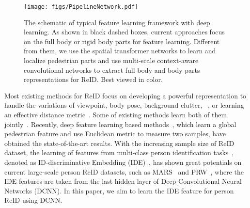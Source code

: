 \documentclass[10pt,twocolumn,letterpaper]{article}
\begin{document}
\begin{figure}[tbp]
  \centering
\texttt{[image: figs/PipelineNetwork.pdf]}
  \vspace{-0.0em}
  \caption{The schematic of typical feature learning framework with deep learning.
  As shown in black dashed boxes, current approaches focus on the full body or rigid body parts for feature learning.
  Different from them, we use the spatial transformer networks to learn and localize pedestrian parts and use
  multi-scale context-aware convolutional networks to extract full-body and body-parts representations for ReID. Best viewed in color.
  }
  \label{fig:framework_simple}
  \vspace{-1.5em}
\end{figure}

Most existing methods for ReID focus on developing a powerful representation to handle the variations of viewpoint, body pose, background clutter, \etc~\cite{xu2014person,GrayECCV08,FarenzenaCVPR10,YangyangECCV14,Yang2017aaai,KviatkovskyPAMI13color,ZhaoruiCVPR13unsupervised,zhaoruiCVPR14learning,LiaoshengcaiCVPR15,MatsukawaCVPR16,LidangweiArxiv16}, or learning an effective distance metric~\cite{KostingerCVPR12,ProsserBMVC10person,ZhengweishiPAMI13reid,LizhenCVPR13,
LiaoshengcaiCVPR15,ZhangLiCVPR16,ChendapengCVPR16similarity}.
Some of existing methods learn both of them jointly~\cite{LiWeiCVPR14,YiICPR14DML,AhmedCVPR15improved,Shihanlin2016Embedding}.
Recently, deep feature learning based methods~\cite{DingPR15deep,Chengde2016person,Varior2016Siamese,VariorECCV16Gated},
which learn a global pedestrian feature and use Euclidean metric to measure two samples, have obtained the state-of-the-art results.
With the increasing sample size of ReID dataset, the learning of features from multi-class person identification
tasks~\cite{XiaotongCVPR16Domain,ZhengliangECCV16,XiaotongARXIV16end,ZhengliangArxiv16,SchumannArxiv16deep},
denoted as ID-discriminative Embedding (IDE)~\cite{ZhengliangArxiv16},
has shown great potentials on current large-scale person ReID datasets, such as MARS~\cite{ZhengliangECCV16} and PRW~\cite{ZhengliangArxiv16},
where the IDE features are taken from the last hidden layer of Deep Convolutional Neural Networks (DCNN).
In this paper, we aim to learn the IDE feature for person ReID using DCNN.
\end{document}
